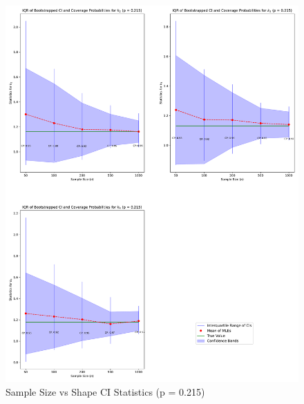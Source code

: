 \documentclass[
]{article}
\begin{document}
\begin{figure}

{\centering \includegraphics{image/plot-n-vs-stats-p215-shape} 

}

\caption{Sample Size vs Shape CI Statistics (p = 0.215)}\label{fig:samp-size-n-vs-stats-215-shape}
\end{figure}
\end{document}

